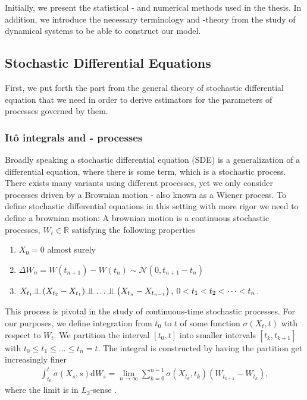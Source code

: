 Initially, we present the statistical - and numerical methods used in the thesis. In addition, we introduce the necessary terminology and -theory from the study of dynamical systems to be able to construct our model.
\subsection{Stochastic Differential Equations}
First, we put forth the part from the general theory of stochastic differential equation that we need in order to derive estimators for the parameters of processes governed by them. 
\subsubsection{Itô integrals and - processes}
Broadly speaking a stochastic differential equation (SDE) is a generalization of a differential equation, where there is some term, which is a stochastic process. There exists many variants using different processes, yet we only consider processes driven by a Brownian motion - also known as a Wiener process. To define stochastic differential equations in this setting with more rigor we need to define a brownian motion: A brownian motion is a continuous stochastic processes, $W_t\in\mathbb{R}$ satisfying the following properties
\begin{enumerate}
    \item $X_0 = 0$ almost surely
    \item $\Delta W_n = W\left(t_{n + 1}\right) - W\left(t_{n}\right)\sim\mathcal{N}\left(0, t_{n + 1} - t_{n}\right)$
    \item $X_{t_1}\indep \left(X_{t_2} - X_{t_1}\right)\indep \dots \indep \left(X_{t_n} - X_{t_{n - 1}}\right), \: 0 < t_1 < t_2 < \dots < t_n$.
\end{enumerate}
This process is pivotal in the study of continuous-time stochastic processes. For our purposes, we define integration from $t_0$ to $t$ of some function $\sigma(X_t, t)$ with respect to $W_t$. We partition the interval $[t_0, t]$ into smaller intervals $[t_k, t_{k + 1}]$ with $t_0 \leq t_1 \leq \dots \leq t_n = t$. The integral is constructed by having the partition get increasingly finer
\begin{align}
    \int_{t_0}^t \sigma(X_s, s) \mathrm{d}W_s = \lim_{n \to \infty}\sum_{k = 0}^{n - 1} \sigma\left(X_{t_k}, t_k\right)\left(W_{t_{k + 1}} - W_{t_k}\right),\label{eq:itoIntegralDefinition}
\end{align}
where the limit is in $L_2$-sense \cite[equation 4.6]{Srkk2019}. \\

